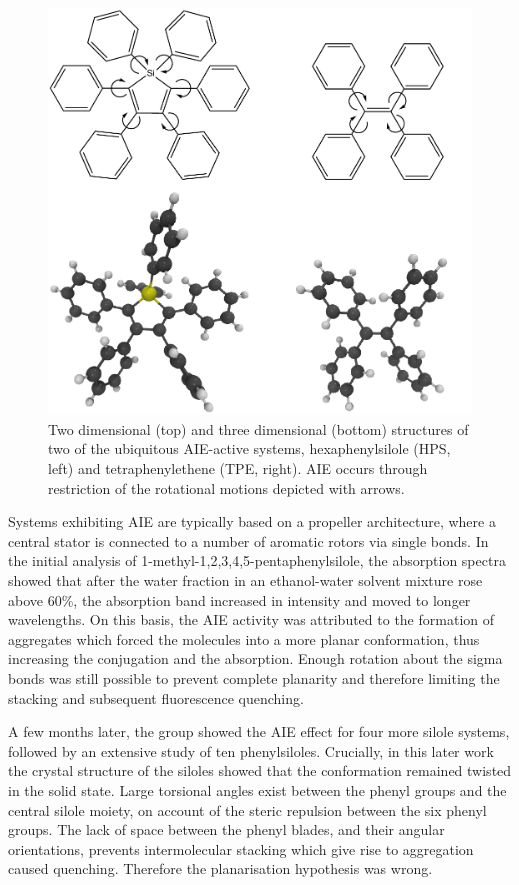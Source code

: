 \begin{figure}[H]
\centering
  \includegraphics[width=0.7\linewidth]{Intro/HPS_TPE.pdf}
  \caption[Examples of AIE-active chromophores]{Two dimensional (top) and three dimensional (bottom) structures of two of the ubiquitous AIE-active systems, hexaphenylsilole (HPS, left) and tetraphenylethene (TPE, right). AIE occurs through restriction of the rotational motions depicted with arrows.}
  \label{figure: HPS_TPE}
\end{figure}

Systems exhibiting AIE are typically based on a propeller architecture, where a central stator is connected to a number of aromatic rotors via single bonds. In the initial analysis of 1-methyl-1,2,3,4,5-pentaphenylsilole, the absorption spectra showed that after the water fraction in an ethanol-water solvent mixture rose above 60\%, the absorption band increased in intensity and moved to longer wavelengths.\cite{Luo2001} On this basis, the AIE activity was attributed to the formation of aggregates which forced the molecules into a more planar conformation, thus increasing the conjugation and the absorption. Enough rotation about the sigma bonds was still possible to prevent complete planarity and therefore limiting the stacking and subsequent fluorescence quenching. 

A few months later, the group showed the AIE effect for four more silole systems, followed by an extensive study of ten phenylsiloles.\cite{Tang2001,Chen2003} Crucially, in this later work the crystal structure of the siloles showed that the conformation remained twisted in the solid state.\cite{Chen2003} Large torsional angles exist between the phenyl groups and the central silole moiety, on account of the steric repulsion between the six phenyl groups. The lack of space between the phenyl blades, and their angular orientations, prevents intermolecular stacking which give rise to aggregation caused quenching. Therefore the planarisation hypothesis was wrong. 

